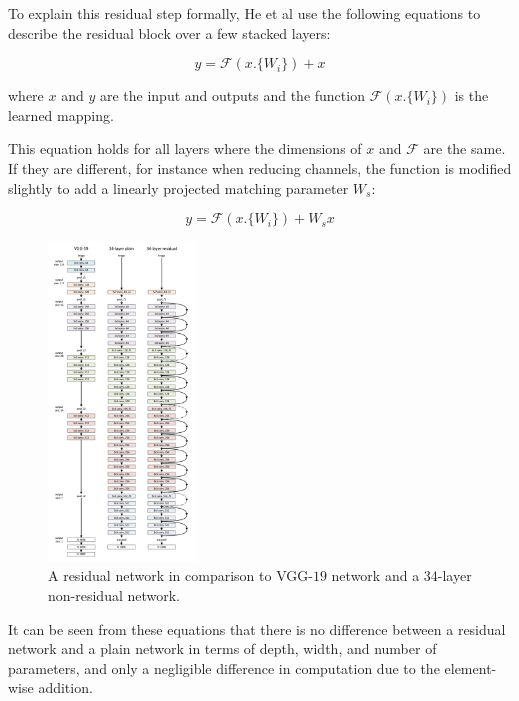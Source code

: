 \documentclass[fleqn,twoside]{article}
\begin{document}
To explain this residual step formally, He et al \cite{he} use the following equations to describe the residual block over a few stacked layers:

\begin{equation}
y = \mathcal{F}(x.\{W_i\}) + x
\end{equation}

where $x$ and $y$ are the input and outputs and the function $\mathcal{F}(x.\{W_i\})$ is the learned mapping. 

This equation holds for all layers where the dimensions of $x$ and $\mathcal{F}$ are the same. If they are different, for instance when reducing channels, the function is modified slightly to add a linearly projected matching parameter $W_s$:

\begin{equation}
y = \mathcal{F}(x.\{W_i\}) + W_s x
\end{equation}




\begin{figure}
	\begin{center}
		\includegraphics[width=0.35\textwidth]{resnet_full.png}
	\end{center}
	\caption{A residual network in comparison to VGG-$19$ network and a $34$-layer non-residual network.}
	\label{fig:resnet_full}
\end{figure} 

It can be seen from these equations that there is no difference between a residual network and a plain network in terms of depth, width, and number of parameters, and only a negligible difference in computation due to the element-wise addition.
\end{document}
